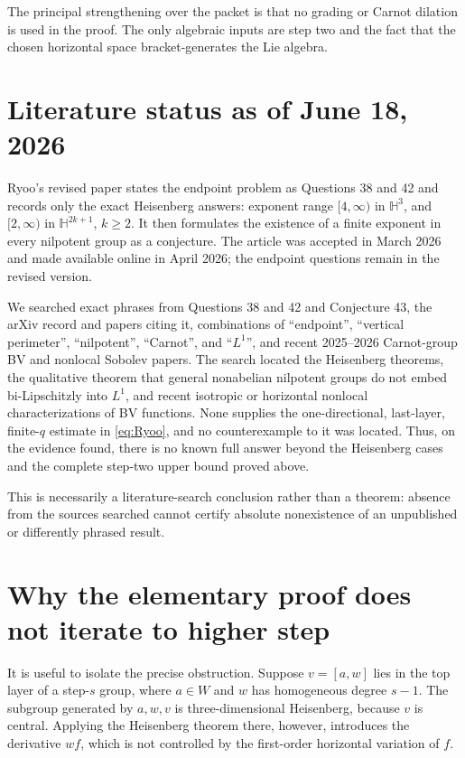 \documentclass[11pt]{article}
\theoremstyle{remark}
\begin{document}
The principal strengthening over the packet is that no grading or Carnot dilation is used
in the proof.  The only algebraic inputs are step two and the fact that the chosen horizontal
space bracket-generates the Lie algebra.

\section{Literature status as of June 18, 2026}
Ryoo's revised paper states the endpoint problem as Questions 38 and 42 and records only
the exact Heisenberg answers: exponent range \([4,\infty)\) in \(\mathbb H^3\), and
\([2,\infty)\) in \(\mathbb H^{2k+1}\), \(k\ge2\).  It then formulates the existence of a
finite exponent in every nilpotent group as a conjecture.  The article was accepted in
March 2026 and made available online in April 2026; the endpoint questions remain in the
revised version.

We searched exact phrases from Questions 38 and 42 and Conjecture 43, the arXiv record
and papers citing it, combinations of ``endpoint'', ``vertical perimeter'', ``nilpotent'',
``Carnot'', and ``\(L^1\)'', and recent 2025--2026 Carnot-group BV and nonlocal Sobolev
papers.  The search located the Heisenberg theorems, the qualitative theorem that general
nonabelian nilpotent groups do not embed bi-Lipschitzly into \(L^1\), and recent isotropic
or horizontal nonlocal characterizations of BV functions.  None supplies the one-directional,
last-layer, finite-\(q\) estimate in \eqref{eq:Ryoo}, and no counterexample to it was located.
Thus, on the evidence found, there is no known full answer beyond the Heisenberg cases
and the complete step-two upper bound proved above.

This is necessarily a literature-search conclusion rather than a theorem: absence from the
sources searched cannot certify absolute nonexistence of an unpublished or differently
phrased result.

\section{Why the elementary proof does not iterate to higher step}
It is useful to isolate the precise obstruction.  Suppose \(v=[a,w]\) lies in the top
layer of a step-\(s\) group, where \(a\in W\) and \(w\) has homogeneous degree \(s-1\).
The subgroup generated by \(a,w,v\) is three-dimensional Heisenberg, because \(v\) is
central.  Applying the Heisenberg theorem there, however, introduces the derivative
\(wf\), which is not controlled by the first-order horizontal variation of \(f\).
\end{document}
